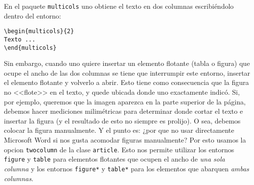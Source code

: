 \documentclass[a4paper,10pt,twocolumn,twoside]{article}
\begin{document}
\begin{table*}[t]
    \centering
\end{table*}

En el paquete \texttt{multicols} uno obtiene el texto en dos columnas escribiéndolo dentro del entorno:
\begin{Verbatim}[fontsize=\fontsize{7pt}{7pt}\selectfont]
\begin{multicols}{2}
Texto ...
\end{multicols}
\end{Verbatim}
Sin embargo, cuando uno quiere insertar un elemento flotante (tabla o figura) que ocupe el ancho de las dos columnas se tiene que interrumpir este entorno, insertar el elemento flotante y volverlo a abrir. Esto tiene como consecuencia que la figura no <<flote>> en el texto, y quede ubicada donde uno exactamente indicó. Si, por ejemplo, queremos que la imagen aparezca en la parte superior de la página, debemos hacer mediciones milimétricas para determinar donde cortar el texto e insertar la figura (y el resultado de esto no siempre es prolijo). O sea, debemos colocar la figura manualmente. Y el punto es: ¿por que no usar directamente Microsoft Word si nos gusta acomodar figuras manualmente? Por esto usamos la opcion \texttt{twocolumn} de la clase \texttt{article}. Esto nos permite utilizar los entornos \texttt{figure} y \texttt{table} para elementos flotantes que ocupen el ancho de \emph{una sola columna} y los entornos \texttt{figure*} y \texttt{table*} para los elementos que abarquen \emph{ambas columnas}.
\end{document}
